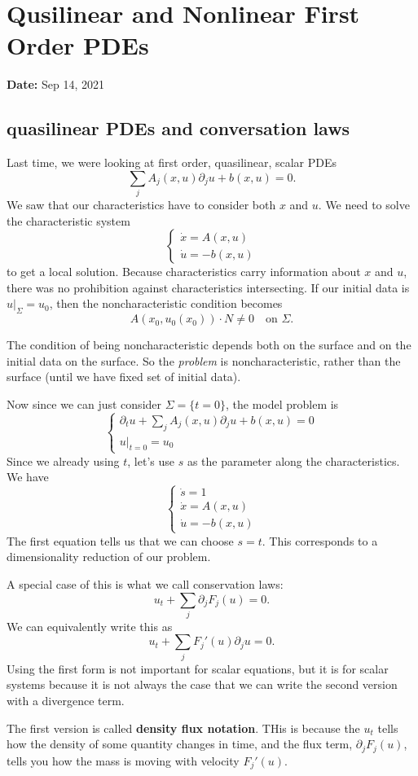 \newpage
\section{Qusilinear and Nonlinear First Order PDEs}
\textbf{Date:} Sep 14, 2021
\subsection{quasilinear PDEs and conversation laws}
Last time, we were looking at first order, quasilinear, scalar PDEs
\[
    \sum_j A_j(x,u)\partial_j u + b(x,u) = 0.
\]
We saw that our characteristics have to consider both $x$ and $u$. We need to solve the characteristic system 
\[
    \begin{cases}
        \dot x = A(x,u)\\ 
        \dot u = -b(x,u)
    \end{cases}
\]
to get a local solution. Because characteristics carry information about $x$ and $u$, there was no prohibition against characteristics intersecting. If our initial data is $u|_\Sigma=u_0$, then the noncharacteristic condition becomes
\[
    A(x_0, u_0(x_0)) \cdot N  \neq 0 \quad \text{on }\Sigma.
\]

\begin{remark}
    The condition of being noncharacteristic depends both on the surface and on the initial data on the surface. So the {\it problem} is noncharacteristic, rather than the surface (until we have fixed set of initial data).
\end{remark}

Now since we can just consider $\Sigma = \{t=0\}$, the model problem is
\[
\begin{cases}
    \partial_t u + \sum_j A_j(x,u) \partial_j u + b(x,u) = 0\\
    u|_{t=0}=u_0
\end{cases}
\]
Since we already using $t$, let's use $s$ as the parameter along the characteristics. We have 
\[
    \begin{cases}
        \dot s = 1\\
        \dot x = A(x,u)\\
        \dot u = -b(x,u)
    \end{cases}
\]
The first equation tells us that we can choose $s=t$. This corresponds to a dimensionality reduction of our problem.

\begin{example}
    A special case of this is what we call conservation laws: 
    \[
        u_t + \sum_j\partial_j F_j(u) = 0.
    \]
    We can equivalently write this as 
    \[
        u_t + \sum_j F_j'(u) \partial_j u = 0.
    \]
    Using the first form is not important for scalar equations, but it is for scalar systems because it is not always the case that we can write the second version with a divergence term.

    The first version is called \textbf{density flux notation}. THis is because the $u_t$ tells how the density of some quantity changes in time, and the flux term, $\partial_jF_j(u)$, tells you how the mass is moving with velocity $F_j'(u).$
\end{example}

